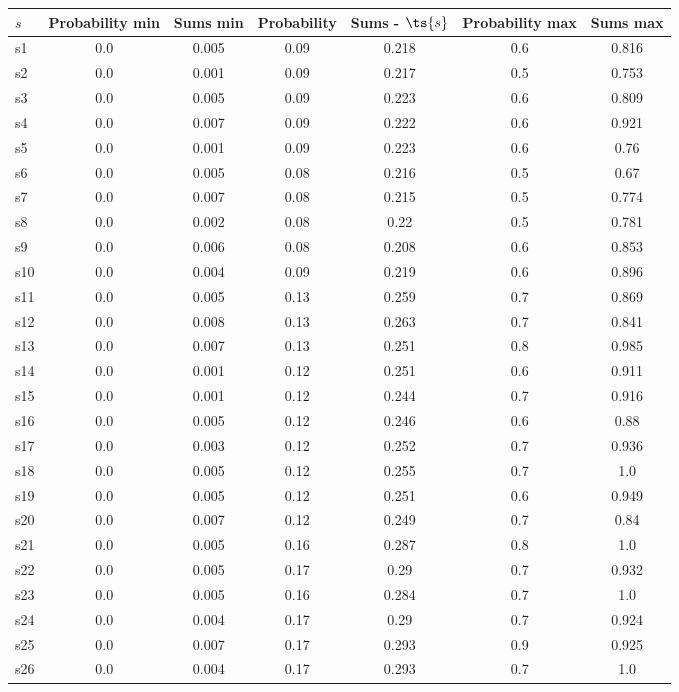 \documentclass{article}
\begin{document}
\noindent\begin{tabular}{|l|c|c|c|c|c|c|}
\hline
$s$& Probability min & Sums min & Probability & Sums - $\ts{s}$ & Probability max & Sums max\\
\hline
s1 &0.0 & 0.005 & 0.09 & 0.218 & 0.6 & 0.816\\
\hline
s2 &0.0 & 0.001 & 0.09 & 0.217 & 0.5 & 0.753\\
\hline
s3 &0.0 & 0.005 & 0.09 & 0.223 & 0.6 & 0.809\\
\hline
s4 &0.0 & 0.007 & 0.09 & 0.222 & 0.6 & 0.921\\
\hline
s5 &0.0 & 0.001 & 0.09 & 0.223 & 0.6 & 0.76\\
\hline
s6 &0.0 & 0.005 & 0.08 & 0.216 & 0.5 & 0.67\\
\hline
s7 &0.0 & 0.007 & 0.08 & 0.215 & 0.5 & 0.774\\
\hline
s8 &0.0 & 0.002 & 0.08 & 0.22 & 0.5 & 0.781\\
\hline
s9 &0.0 & 0.006 & 0.08 & 0.208 & 0.6 & 0.853\\
\hline
s10 &0.0 & 0.004 & 0.09 & 0.219 & 0.6 & 0.896\\
\hline
s11 &0.0 & 0.005 & 0.13 & 0.259 & 0.7 & 0.869\\
\hline
s12 &0.0 & 0.008 & 0.13 & 0.263 & 0.7 & 0.841\\
\hline
s13 &0.0 & 0.007 & 0.13 & 0.251 & 0.8 & 0.985\\
\hline
s14 &0.0 & 0.001 & 0.12 & 0.251 & 0.6 & 0.911\\
\hline
s15 &0.0 & 0.001 & 0.12 & 0.244 & 0.7 & 0.916\\
\hline
s16 &0.0 & 0.005 & 0.12 & 0.246 & 0.6 & 0.88\\
\hline
s17 &0.0 & 0.003 & 0.12 & 0.252 & 0.7 & 0.936\\
\hline
s18 &0.0 & 0.005 & 0.12 & 0.255 & 0.7 & 1.0\\
\hline
s19 &0.0 & 0.005 & 0.12 & 0.251 & 0.6 & 0.949\\
\hline
s20 &0.0 & 0.007 & 0.12 & 0.249 & 0.7 & 0.84\\
\hline
s21 &0.0 & 0.005 & 0.16 & 0.287 & 0.8 & 1.0\\
\hline
s22 &0.0 & 0.005 & 0.17 & 0.29 & 0.7 & 0.932\\
\hline
s23 &0.0 & 0.005 & 0.16 & 0.284 & 0.7 & 1.0\\
\hline
s24 &0.0 & 0.004 & 0.17 & 0.29 & 0.7 & 0.924\\
\hline
s25 &0.0 & 0.007 & 0.17 & 0.293 & 0.9 & 0.925\\
\hline
s26 &0.0 & 0.004 & 0.17 & 0.293 & 0.7 & 1.0\\

\end{tabular}
\end{document}
